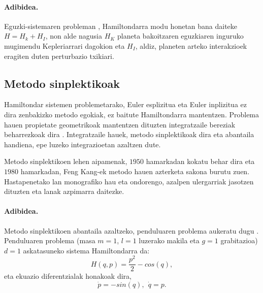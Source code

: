 \paragraph*{Adibidea.} Eguzki-sistemaren probleman \cite{Saha1992,Wisdom2006}, Hamiltondarra modu honetan bana daiteke $H=H_k+H_I$, non alde nagusia $H_K$ planeta bakoitzaren eguzkiaren inguruko mugimendu Kepleriarrari dagokion eta $H_I$, aldiz, planeten arteko interakzioek eragiten duten perturbazio txikiari.   

\subsection{Metodo sinplektikoak}

Hamiltondar sistemen problemetarako, Euler esplizitua eta Euler inplizitua ez dira zenbakizko metodo egokiak, ez baitute Hamiltondarra mantentzen. Problema hauen propietate geometrikoak mantentzen dituzten integratzaile bereziak beharrezkoak dira \cite{JMSanz-Serna1994,SSerna2015b}. Integratzaile hauek, metodo sinplektikoak dira eta abantaila handiena, epe luzeko integrazioetan azaltzen dute.

Metodo sinplektikoen lehen aipamenak, $1950$ hamarkadan kokatu behar dira eta $1980$ hamarkadan, Feng Kang-ek metodo hauen azterketa sakona burutu zuen. Hastapenetako lan monografiko hau \cite{JMSanz-Serna1994} eta ondorengo, azalpen ulergarriak jasotzen dituzten \cite{Hairer2006} eta  \cite{Leimkuhler2004} lanak azpimarra daitezke.    


\paragraph*{Adibidea.} Metodo sinplektikoen abantaila azaltzeko, penduluaren problema aukeratu dugu \cite{Hairer2015a}. Penduluaren problema (masa $m=1$, $l=1$ luzerako makila eta $g=1$ grabitazioa) $d=1$ askatasuneko sistema Hamiltondarra da:
\begin{equation}
H(q,p)= \frac{p^2}{2}- cos (q),
\end{equation}
%
eta ekuazio diferentzialak honakoak dira,
\begin{equation}
\label{eq:pendulua}
\dot{p}= -sin (q), \ \ \dot{q}=p.
\end{equation}

